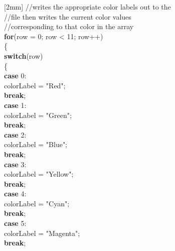 \documentclass[12pt]{article}
\begin{document}
\begin{flushleft}
{				[2mm]
\qquad \qquad  \qquad \qquad	//writes the appropriate color labels out to the\\
\qquad \qquad  \qquad \qquad //file then writes the current color values\\
\qquad \qquad  \qquad \qquad //corresponding to that color in the array\\
\qquad \qquad  \qquad \qquad	\textbf{for}(row = 0; row < 11; row++)\\
\qquad \qquad  \qquad \qquad	\{\\
\qquad \qquad  \qquad \qquad \qquad	\textbf{switch}(row)\\
\qquad \qquad  \qquad \qquad \qquad	\{\\
\qquad \qquad  \qquad \qquad \qquad \qquad		\textbf{case} 0:\\
\qquad \qquad  \qquad \qquad \qquad \qquad	\qquad		colorLabel = "Red";\\
\qquad \qquad  \qquad \qquad \qquad \qquad		\textbf{break};\\
						[2mm]
\qquad \qquad \qquad \qquad \qquad \qquad		\textbf{case} 1:\\
\qquad \qquad \qquad \qquad \qquad \qquad	\qquad	colorLabel = "Green";\\
\qquad \qquad \qquad \qquad \qquad \qquad		\textbf{break};\\
						[2mm]
\qquad \qquad \qquad \qquad \qquad \qquad		\textbf{case} 2:\\
\qquad \qquad \qquad \qquad \qquad \qquad	\qquad	colorLabel = "Blue";\\
\qquad \qquad \qquad \qquad \qquad \qquad		\textbf{break};\\
						[2mm]
\qquad \qquad \qquad \qquad \qquad \qquad		\textbf{case} 3:\\
\qquad \qquad \qquad \qquad \qquad \qquad	\qquad	colorLabel = "Yellow";\\
\qquad \qquad \qquad \qquad \qquad \qquad			\textbf{break};\\
						[2mm]
\qquad \qquad \qquad \qquad \qquad \qquad		\textbf{case} 4:\\
\qquad \qquad \qquad \qquad \qquad \qquad	\qquad	colorLabel = "Cyan";\\
\qquad \qquad \qquad \qquad \qquad \qquad			\textbf{break};\\
						[2mm]
\qquad \qquad \qquad \qquad \qquad \qquad		\textbf{case} 5:\\
\qquad \qquad \qquad \qquad \qquad \qquad	\qquad	colorLabel = "Magenta";\\
\qquad \qquad \qquad \qquad \qquad \qquad		\textbf{break};\\
}
\end{flushleft}
\end{document}
